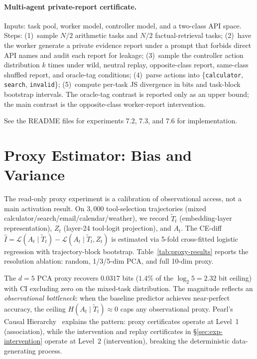 \documentclass{article}
\begin{document}
\paragraph{Multi-agent private-report certificate.} Inputs: task pool, worker model, controller model, and a two-class API space. Steps: (1)~sample $N/2$ arithmetic tasks and $N/2$ factual-retrieval tasks; (2)~have the worker generate a private evidence report under a prompt that forbids direct API names and audit each report for leakage; (3)~sample the controller action distribution $k$ times under wild, neutral replay, opposite-class report, same-class shuffled report, and oracle-tag conditions; (4)~parse actions into \{\texttt{calculator}, \texttt{search}, \texttt{invalid}\}; (5)~compute per-task JS divergence in bits and task-block bootstrap intervals. The oracle-tag contrast is reported only as an upper bound; the main contrast is the opposite-class worker-report intervention.

See the README files for experiments 7.2, 7.3, and 7.6 for implementation.

\section{Proxy Estimator: Bias and Variance}
\label{app:proxy-bias}

The read-only proxy experiment is a calibration of observational access, not a main activation result. On $3{,}000$ tool-selection trajectories (mixed calculator/search/email/calendar/weather), we record $\tilde T_t$ (embedding-layer representation), $Z_t$ (layer-24 tool-logit projection), and $A_t$. The CE-diff $\hat I = \mathcal{L}(A_t\mid\tilde T_t) - \mathcal{L}(A_t\mid\tilde T_t,Z_t)$ is estimated via 5-fold cross-fitted logistic regression with trajectory-block bootstrap. Table~\ref{tab:proxy-results} reports the resolution ablation: random, 1/3/5-dim PCA, and full 10-dim proxy.

The $d{=}5$ PCA proxy recovers $0.0317$ bits ($1.4\%$ of the $\log_2 5 = 2.32$ bit ceiling) with CI excluding zero on the mixed-task distribution. The magnitude reflects an \emph{observational bottleneck}: when the baseline predictor achieves near-perfect accuracy, the ceiling $H(A_t \mid \tilde T_t) \approx 0$ caps any observational proxy. Pearl's Causal Hierarchy~\citep{pearl2009causality} explains the pattern: proxy certificates operate at Level~1 (association), while the intervention and replay certificates in \S\ref{sec:exp-intervention} operate at Level~2 (intervention), breaking the deterministic data-generating process.
\end{document}
